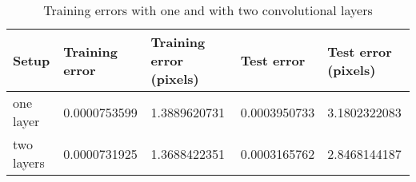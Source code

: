 \begin{table}[h!]
\centering
\footnotesize
\begin{tabular}{|l|l|l|l|l|}
	\hline
		\textbf{Setup} & \textbf{Training error} & \textbf{Training error (pixels)} & \textbf{Test error} & \textbf{Test error (pixels)}\\
	\hline
		one layer	& 0.0000753599%
					& 1.3889620731%
					& 0.0003950733%
					& 3.1802322083%
					\\
	\hline
		two layers	& 0.0000731925%
					& 1.3688422351%
					& 0.0003165762%
					& 2.8468144187%
					\\
	\hline
	\end{tabular}
	\normalsize
	\caption{Training errors with one and with two convolutional layers}
	\label{tab:gabor_errors_2cl}
\end{table}
